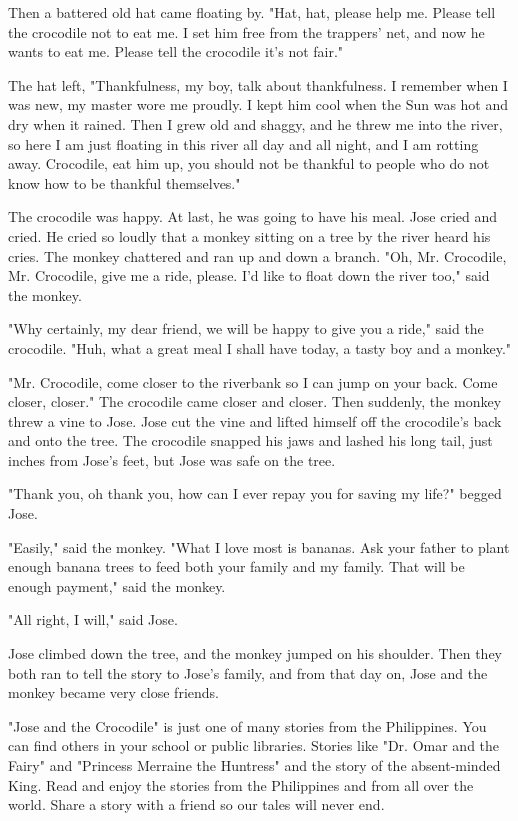 Then a battered old hat came floating by. "Hat, hat, please help me. Please tell the crocodile not to eat me. I set him free from the trappers' net, and now he wants to eat me. Please tell the crocodile it's not fair."

The hat left, "Thankfulness, my boy, talk about thankfulness. I remember when I was new, my master wore me proudly. I kept him cool when the Sun was hot and dry when it rained. Then I grew old and shaggy, and he threw me into the river, so here I am just floating in this river all day and all night, and I am rotting away. Crocodile, eat him up, you should not be thankful to people who do not know how to be thankful themselves."

The crocodile was happy. At last, he was going to have his meal. Jose cried and cried. He cried so loudly that a monkey sitting on a tree by the river heard his cries. The monkey chattered and ran up and down a branch. "Oh, Mr. Crocodile, Mr. Crocodile, give me a ride, please. I'd like to float down the river too," said the monkey.

"Why certainly, my dear friend, we will be happy to give you a ride," said the crocodile. "Huh, what a great meal I shall have today, a tasty boy and a monkey."

"Mr. Crocodile, come closer to the riverbank so I can jump on your back. Come closer, closer." The crocodile came closer and closer. Then suddenly, the monkey threw a vine to Jose. Jose cut the vine and lifted himself off the crocodile's back and onto the tree. The crocodile snapped his jaws and lashed his long tail, just inches from Jose's feet, but Jose was safe on the tree.

"Thank you, oh thank you, how can I ever repay you for saving my life?" begged Jose.

"Easily," said the monkey. "What I love most is bananas. Ask your father to plant enough banana trees to feed both your family and my family. That will be enough payment," said the monkey.

"All right, I will," said Jose.

Jose climbed down the tree, and the monkey jumped on his shoulder. Then they both ran to tell the story to Jose's family, and from that day on, Jose and the monkey became very close friends.

"Jose and the Crocodile" is just one of many stories from the Philippines. You can find others in your school or public libraries. Stories like "Dr. Omar and the Fairy" and "Princess Merraine the Huntress" and the story of the absent-minded King. Read and enjoy the stories from the Philippines and from all over the world. Share a story with a friend so our tales will never end.

